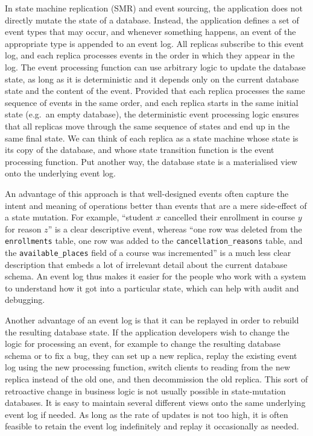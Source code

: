 \documentclass[sigconf,nonacm]{acmart}
\begin{document}
In state machine replication (SMR) and event sourcing, the application does not directly mutate the state of a database.
Instead, the application defines a set of event types that may occur, and whenever something happens, an event of the appropriate type is appended to an event log.
All replicas subscribe to this event log, and each replica processes events in the order in which they appear in the log.
The event processing function can use arbitrary logic to update the database state, as long as it is deterministic and it depends only on the current database state and the content of the event.
Provided that each replica processes the same sequence of events in the same order, and each replica starts in the same initial state (e.g.\ an empty database), the deterministic event processing logic ensures that all replicas move through the same sequence of states and end up in the same final state.
We can think of each replica as a state machine whose state is its copy of the database, and whose state transition function is the event processing function.
Put another way, the database state is a materialised view onto the underlying event log.

An advantage of this approach is that well-designed events often capture the intent and meaning of operations better than events that are a mere side-effect of a state mutation.
For example, ``student $x$ cancelled their enrollment in course $y$ for reason $z$'' is a clear descriptive event, whereas ``one row was deleted from the \verb+enrollments+ table, one row was added to the \verb+cancellation_reasons+ table, and the \verb+available_places+ field of a course was incremented'' is a much less clear description that embeds a lot of irrelevant detail about the current database schema.
An event log thus makes it easier for the people who work with a system to understand how it got into a particular state, which can help with audit and debugging.

Another advantage of an event log is that it can be replayed in order to rebuild the resulting database state.
If the application developers wish to change the logic for processing an event, for example to change the resulting database schema or to fix a bug, they can set up a new replica, replay the existing event log using the new processing function, switch clients to reading from the new replica instead of the old one, and then decommission the old replica.
This sort of retroactive change in business logic is not usually possible in state-mutation databases.
It is easy to maintain several different views onto the same underlying event log if needed.
As long as the rate of updates is not too high, it is often feasible to retain the event log indefinitely and replay it occasionally as needed.
\end{document}
